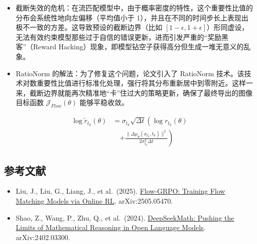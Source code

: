 \begin{itemize}
\item
  截断失效的危机：在流匹配模型中，由于概率密度的特性，这个重要性比值的分布会系统性地向左偏移（平均值小于 1），并且在不同的时间步长上表现出极不一致的方差。这导致预设的截断边界（比如 \([1-\epsilon,1+\epsilon]\)）形同虚设，无法有效约束模型那些过于自信的错误更新，进而引发严重的``奖励黑客''（Reward Hacking）现象，即模型钻空子获得高分但生成一堆无意义的乱象。
\item
  RatioNorm 的解法：为了修复这个问题，论文引入了 RatioNorm 技术。该技术对数重要性比值进行标准化处理，强行将其分布重新居中到零附近。这样一来，截断边界就能再次精准地``卡''住过大的策略更新，确保了最终导出的图像目标函数 \(\mathcal{J}_{Flow}(\theta)\) 能够平稳收敛。
\end{itemize}

\[
\begin{aligned}
\log \tilde{r}_{t_k}(\theta)
&=
\sigma_{t_k}\sqrt{\Delta t}
\left(
\log r_{t_k}(\theta)
\right.
\\
&\quad\left.
+\frac{\|\Delta\mu_\theta(x_{t_k},t_k)\|^2}{2\sigma_{t_k}^2\Delta t}
\right)
\end{aligned}
\]

\hypertarget{ux53c2ux8003ux6587ux732e-167}{%
\subsection{参考文献}\label{ux53c2ux8003ux6587ux732e-167}}

\begin{itemize}
\tightlist
\item
  Liu, J., Liu, G., Liang, J., et al.~(2025). \href{https://arxiv.org/abs/2505.05470}{Flow-GRPO: Training Flow Matching Models via Online RL}. arXiv:2505.05470.
\item
  Shao, Z., Wang, P., Zhu, Q., et al.~(2024). \href{https://arxiv.org/abs/2402.03300}{DeepSeekMath: Pushing the Limits of Mathematical Reasoning in Open Language Models}. arXiv:2402.03300.
\end{itemize}

\clearpage
